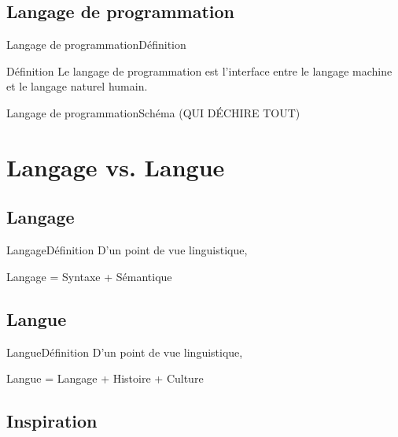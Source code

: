 \documentclass[notes]{beamer}
\begin{document}
\subsection{Langage de programmation}

\begin{frame}{Langage de programmation}{Définition}
    \pause
    \begin{block}{Définition}
    Le langage de programmation est l'interface entre le langage machine et le
    langage naturel humain.
    \end{block}
\end{frame}

\begin{frame}{Langage de programmation}{Schéma (QUI DÉCHIRE TOUT)}
    \begin{center}
    \end{center}
\end{frame}

\section{Langage vs. Langue}

\subsection{Langage}

\begin{frame}{Langage}{Définition}
    \pause
    D'un point de vue linguistique, \pause
    \begin{center}
    Langage = Syntaxe + Sémantique
    \end{center}
\end{frame}

\subsection{Langue}

\begin{frame}{Langue}{Définition}
    \pause
    D'un point de vue linguistique,\pause
    \begin{center}
    Langue = Langage + Histoire + Culture
    \end{center}
\end{frame}

\subsection{Inspiration}
\end{document}
